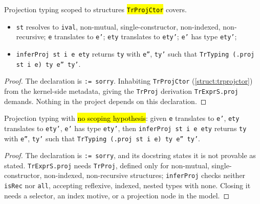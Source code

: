 \begin{theorem}
  \label{thm:vtc-inferproj-struct}
  \leanok

   Projection typing scoped to structures \hl{\texttt{TrProjCtor}} covers.
  \begin{itemize}
  \item {} \texttt{st} resolves to \texttt{ival}, non-mutual, single-constructor,
    non-indexed, non-recursive; \texttt{e} translates to \texttt{e'}; \texttt{ety} translates to
    \texttt{ety'}; \texttt{e'} has type \texttt{ety'};
  \item {} \texttt{inferProj st i e ety} returns \texttt{ty} with \texttt{e''},
    \texttt{ty'} such that \texttt{TrTyping (.proj st i e) ty e'' ty'}.
  \end{itemize}
\end{theorem}
\begin{proof}
  \stSorry{} The declaration is \texttt{:= sorry}.
   Inhabiting \texttt{TrProjCtor} (\ref{struct:trprojctor}) from the
  kernel-side metadata, giving the \texttt{TrProj} derivation \texttt{TrExprS.proj} demands.
  Nothing in the project depends on this declaration.
\end{proof}

\begin{theorem}
  \label{thm:vtc-inferproj}
  \leanok
   Projection typing with \hl{no scoping hypothesis}: given \texttt{e} translates
  to \texttt{e'}, \texttt{ety} translates to \texttt{ety'}, \texttt{e'} has type \texttt{ety'},
  then \texttt{inferProj st i e ety} returns \texttt{ty} with \texttt{e''}, \texttt{ty'} such
  that \texttt{TrTyping (.proj st i e) ty e'' ty'}.
\end{theorem}
\begin{proof}
  \stSorry{} The declaration is \texttt{:= sorry}, and its docstring states it is not provable
  as stated.
   \texttt{TrExprS.proj} needs \texttt{TrProj}, defined only for non-mutual,
  single-constructor, non-indexed, non-recursive structures; \texttt{inferProj} checks neither
  \texttt{isRec} nor \texttt{all}, accepting reflexive, indexed, nested types with none. Closing
  it needs a selector, an index motive, or a projection node in the model.
\end{proof}

